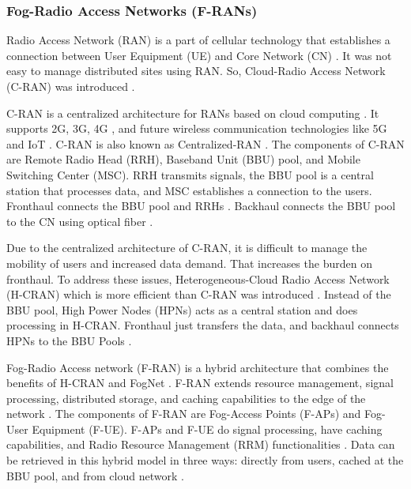
\subsubsection{Fog-Radio Access Networks (F-RANs)}

Radio Access Network (RAN) is a part of cellular technology that establishes a connection between User Equipment (UE) and Core Network (CN) \cite{wi}. It was not easy to manage distributed sites using RAN. So, Cloud-Radio Access Network (C-RAN) was introduced \cite{rf}.  \par 

C-RAN is a centralized architecture for RANs based on cloud computing \cite{mar}. It supports 2G, 3G, 4G \cite{w}, and future wireless communication technologies like 5G and IoT \cite{mar}. C-RAN is also known as Centralized-RAN \cite{w}. The components of C-RAN are Remote Radio Head (RRH), Baseband Unit (BBU) pool, and Mobile Switching Center (MSC). RRH transmits signals, the BBU pool is a central station that processes data, and MSC establishes a connection to the users. Fronthaul connects the BBU pool and RRHs \cite{guizani2017cran}. Backhaul connects the BBU pool to the CN using optical fiber \cite{raj}. \par

Due to the centralized architecture of C-RAN, it is difficult to manage the mobility of users and increased data demand. That increases the burden on fronthaul. To address these issues, Heterogeneous-Cloud Radio Access Network (H-CRAN) which is more efficient than C-RAN was introduced \cite{zhang2017fog}. Instead of the BBU pool, High Power Nodes (HPNs) acts as a central station and does processing in H-CRAN. Fronthaul just transfers the data, and backhaul connects HPNs to the BBU Pools \cite{guizani2017cran}. \par

Fog-Radio Access network (F-RAN) is a hybrid architecture that combines the benefits of H-CRAN and FogNet \cite{mukherjee2018survey}. F-RAN extends resource management, signal processing, distributed storage, and caching capabilities to the edge of the network \cite{zhang2017fog}. The components of F-RAN are Fog-Access Points (F-APs) and Fog-User Equipment (F-UE). F-APs and F-UE do signal processing, have caching capabilities, and Radio Resource Management (RRM) functionalities \cite{guizani2017cran}. Data can be retrieved in this hybrid model in three ways: directly from users, cached at the BBU pool, and from cloud network \cite{mukherjee2018survey}. \par

